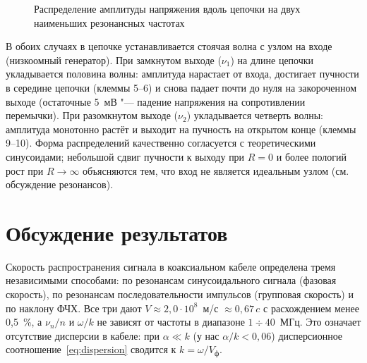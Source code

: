 \documentclass[a4paper,12pt]{article}
\begin{document}
\begin{figure}[!ht]
    \centering
    \caption{Распределение амплитуды напряжения вдоль цепочки на двух
             наименьших резонансных частотах}
    \label{fig:model_dist}
\end{figure}

В обоих случаях в цепочке устанавливается стоячая волна с узлом на
входе (низкоомный генератор). При замкнутом выходе ($\nu_1$) на длине
цепочки укладывается половина волны: амплитуда нарастает от входа,
достигает пучности в середине цепочки (клеммы 5--6) и снова падает
почти до нуля на закороченном выходе (остаточные 5~мВ "--- падение
напряжения на сопротивлении перемычки). При разомкнутом выходе ($\nu_2$)
укладывается четверть волны: амплитуда монотонно растёт и выходит на
пучность на открытом конце (клеммы 9--10). Форма распределений качественно
согласуется с теоретическими синусоидами; небольшой сдвиг пучности
к выходу при $R = 0$ и более пологий рост при $R\to\infty$ объясняются
тем, что вход не является идеальным узлом (см. обсуждение резонансов).

\section{Обсуждение результатов}

Скорость распространения сигнала в коаксиальном кабеле определена тремя
независимыми способами: по резонансам синусоидального сигнала
(фазовая скорость), по резонансам последовательности импульсов
(групповая скорость) и по наклону ФЧХ. Все три дают
$V\approx2{,}0\cdot10^8$~м/с $\approx0{,}67\,c$ с расхождением менее
0,5~\%, а $\nu_n/n$ и $\omega/k$ не зависят от частоты в диапазоне
$1\div40$~МГц. Это означает отсутствие дисперсии в кабеле: при
$\alpha\ll k$ (у нас $\alpha/k < 0{,}06$) дисперсионное
соотношение~\eqref{eq:dispersion} сводится к $k = \omega/V_\text{ф}$.
\end{document}
